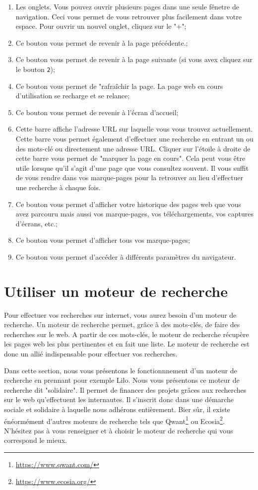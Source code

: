 \documentclass[12pt]{book}
\begin{document}
	\begin{enumerate}
		\item Les onglets.\newline
				Vous pouvez ouvrir plusieurs pages dans une seule fênetre de navigation.
				Ceci vous permet de vous retrouver plus facilement dans votre espace.
				Pour ouvrir un nouvel onglet, cliquez sur le "+";
		\item Ce bouton vous permet de revenir à la page précédente.;
		\item Ce bouton vous permet de revenir à la page suivante (si vous avex cliquez sur le bouton \texttt{2});
		\item Ce bouton vous permet de "rafraîchir la page.
				La page web en cours d'utilisation se recharge et se relance;
		\item Ce bouton vous permet de revenir à l'écran d'accueil;
		\item Cette barre affiche l'adresse URL sur laquelle vous vous trouvez actuellement.
				Cette barre vous permet également d'effectuer une recherche en entrant un ou des mots-clé ou directement une adresse URL.
				Cliquer sur l'étoile à droite de cette barre vous permet de "marquer la page en cours".
				Cela peut vous être utile lorsque qu'il s'agit d'une page que vous consultez souvent.
				Il vous suffit de vous rendre dans vos marque-pages pour la retrouver au lieu d'effectuer une recherche à chaque fois.
		\item Ce bouton vous permet d'afficher votre historique des pages web que vous avez parcouru mais aussi vos marque-pages, vos téléchargements, vos captures d'écrans, etc.;
		\item Ce bouton vous permet d'afficher tous vos marque-pages;
		\item Ce bouton vous permet d'accéder à différents paramètres du navigateur.
	\end{enumerate}
\section{Utiliser un moteur de recherche}\label{sec:moteurrecherche}
	Pour effectuer vos recherches sur internet, vous aurez besoin d'un moteur de recherche.
	Un moteur de recherche permet, grâce à des mots-clés, de faire des recherches sur le web.
	A partir de ces mots-clés, le moteur de recherche récupère les pages web les plus pertinentes et en fait une liste.
	Le moteur de recherche est donc un allié indispensable pour effectuer vos recherches.\par
	Dans cette section, nous vous présentons le fonctionnnement d'un moteur de recherche en prennant pour exemple Lilo.
	Nous vous présentons ce moteur de recherche dit "solidaire". 
	Il permet de financer des projets grâces aux recherches sur le web qu'effectuent les internautes.
	Il s'inscrit donc dans une démarche sociale et solidaire à laquelle nous adhérons entièrement.
	Bier sûr, il existe énéormément d'autres moteurs de recherche tels que Qwant\footnote{\href{https://www.qwant.com/}{https://www.qwant.com/}} ou Ecosia\footnote{\href{https://www.ecosia.org/}{https://www.ecosia.org/}}.
	N'hésitez pas à vous renseigner et à choisir le moteur de recherche qui vous correspond le mieux.
\end{document}
